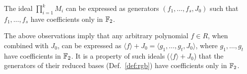 




\begin{Proposition}
The ideal $\prod_{i=1}^{k}M_i$ can be expressed as generators $(f_1,\dots,f_s,J_0)$ such that
$f_1,\dots,f_s$ have coefficients only in ${\mathbb{F}}_2$.
\end{Proposition}

The above observations imply that any arbitrary polynomial $f \in R$, when combined with $J_0$, can be expressed 
as $\langle f\rangle+ J_0  = \langle g_1, \dots, g_t, J_0 \rangle$, where $g_1, \dots, g_t$ have coefficients 
in ${\mathbb{F}}_2$.
It is a property of such ideals ($\langle f \rangle + J_0 $) that the generators of their reduced
\Grobner bases (Def.~\ref{def:rgb}) have coefficients only in ${\mathbb{F}}_{2}$. 

